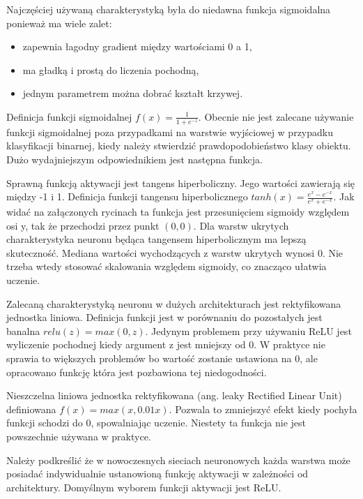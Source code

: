 \documentclass[12pt,a4paper,twoside,titlepage,openright]{book}
\begin{document}
Najczęściej używaną charakterystyką była do niedawna funkcja sigmoidalna ponieważ ma wiele zalet:
\begin{itemize}
\item zapewnia łagodny gradient między wartościami 0 a 1,
\item ma gładką i prostą do liczenia pochodną,
\item jednym parametrem można dobrać kształt krzywej.
\end{itemize}
Definicja funkcji sigmoidalnej \(f(x) = \frac{1}{1+e^{-z}}\).
Obecnie nie jest zalecane używanie funkcji sigmoidalnej poza przypadkami na warstwie wyjściowej w przypadku klasyfikacji binarnej, kiedy należy stwierdzić prawdopodobieństwo klasy obiektu. Dużo wydajniejszym odpowiednikiem jest następna funkcja.

Sprawną funkcją aktywacji jest tangens hiperboliczny. Jego wartości zawierają się między -1 i 1. Definicja funkcji tangensu hiperbolicznego \(tanh(x) = \frac{e^{x} - e^{-x}}{e^{x} + e^{-x}}\). Jak widać na załączonych rycinach ta funkcja jest przesunięciem sigmoidy względem osi y, tak że przechodzi przez punkt \((0,0)\). Dla warstw ukrytych charakterystyka neuronu będąca tangensem hiperbolicznym ma lepszą skuteczność. Mediana wartości wychodzących z warstw  ukrytych wynosi 0. Nie trzeba wtedy stosować skalowania względem sigmoidy, co znacząco ułatwia uczenie.

Zalecaną charakterystyką neuronu w dużych architekturach jest rektyfikowana jednostka liniowa. Definicja funkcji jest w porównaniu do pozostałych jest banalna \(relu(z) = max(0,z)\). Jedynym problemem przy używaniu ReLU jest wyliczenie pochodnej kiedy argument z jest mniejszy od 0. W praktyce nie sprawia to większych problemów bo wartość zostanie ustawiona na 0, ale opracowano funkcję która jest pozbawiona tej niedogodności.

Nieszczelna liniowa jednostka rektyfikowana (ang. leaky Rectified Linear Unit) definiowana \(f(x) = max(x, 0.01x)\). Pozwala to zmniejszyć efekt kiedy pochyła funkcji schodzi do 0, spowalniając uczenie. Niestety ta funkcja nie jest powszechnie używana w praktyce.

Należy podkreślić że w nowoczesnych sieciach neuronowych każda warstwa może posiadać indywidualnie ustanowioną funkcję aktywacji w zależności od architektury. Domyślnym wyborem funkcji aktywacji jest ReLU. 
\end{document}
